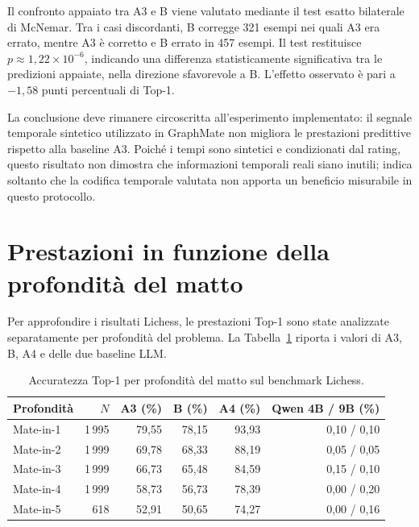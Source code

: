 Il confronto appaiato tra A3 e B viene valutato mediante il test esatto bilaterale di McNemar. Tra i casi discordanti, B corregge 321 esempi nei quali A3 era errato, mentre A3 è corretto e B errato in 457 esempi. Il test restituisce \(p \approx 1{,}22 \times 10^{-6}\), indicando una differenza statisticamente significativa tra le predizioni appaiate, nella direzione sfavorevole a B. L'effetto osservato è pari a \(-1{,}58\) punti percentuali di Top-1.

La conclusione deve rimanere circoscritta all'esperimento implementato: il segnale temporale sintetico utilizzato in GraphMate non migliora le prestazioni predittive rispetto alla baseline A3. Poiché i tempi sono sintetici e condizionati dal rating, questo risultato non dimostra che informazioni temporali reali siano inutili; indica soltanto che la codifica temporale valutata non apporta un beneficio misurabile in questo protocollo.

\section{Prestazioni in funzione della profondità del matto}

Per approfondire i risultati Lichess, le prestazioni Top-1 sono state analizzate separatamente per profondità del problema. La Tabella~\ref{tab:lichess-depth-results} riporta i valori di A3, B, A4 e delle due baseline LLM.

\begin{table}[htbp]
    \centering
    \small
    \caption{Accuratezza Top-1 per profondità del matto sul benchmark Lichess.}
    \label{tab:lichess-depth-results}
    \begin{tabular}{lrrrrr}
        \toprule
        Profondità & \(N\) & A3 (\%) & B (\%) & A4 (\%) & Qwen 4B / 9B (\%) \\
        \midrule
        Mate-in-1 & 1\,995 & 79,55 & 78,15 & 93,93 & 0,10 / 0,10 \\
        Mate-in-2 & 1\,999 & 69,78 & 68,33 & 88,19 & 0,05 / 0,05 \\
        Mate-in-3 & 1\,999 & 66,73 & 65,48 & 84,59 & 0,15 / 0,10 \\
        Mate-in-4 & 1\,999 & 58,73 & 56,73 & 78,39 & 0,00 / 0,20 \\
        Mate-in-5 & 618   & 52,91 & 50,65 & 74,27 & 0,00 / 0,16 \\
        \bottomrule
    \end{tabular}
\end{table}

